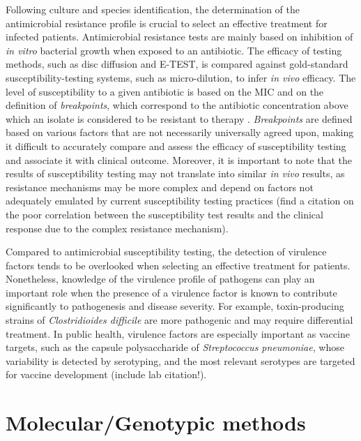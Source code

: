 Following culture and species identification, the determination of the antimicrobial resistance profile is crucial to select an effective treatment for infected patients. Antimicrobial resistance tests are mainly based on inhibition of \textit{in vitro} bacterial growth when exposed to an antibiotic. The efficacy of testing methods, such as disc diffusion and E-TEST, is compared against gold-standard susceptibility-testing systems, such as micro-dilution, to infer \textit{in vivo} efficacy.
The level of susceptibility to a given antibiotic is based on the \ac{MIC} and on the definition of \textit{breakpoints}, which correspond to the antibiotic concentration above which an isolate is considered to be resistant to therapy \cite{didelot_transforming_2012}. \textit{Breakpoints} are defined based on various factors that are not necessarily universally agreed upon, making it difficult to accurately compare and assess the efficacy of susceptibility testing and associate it with clinical outcome. Moreover, it is important to note that the results of susceptibility testing may not translate into similar \textit{in vivo} results, as resistance mechanisms may be more complex and depend on factors not adequately emulated by current susceptibility testing practices \cite{didelot_transforming_2012} (find a citation on the poor correlation between the susceptibility test results and the clinical response due to the complex resistance mechanism).

Compared to antimicrobial susceptibility testing, the detection of virulence factors tends to be overlooked when selecting an effective treatment for patients. Nonetheless, knowledge of the virulence profile of pathogens can play an important role when the presence of a virulence factor is known to contribute significantly to pathogenesis and disease severity. For example, toxin-producing strains of \textit{Clostridioides difficile} are more pathogenic and may require differential treatment. In public health, virulence factors are especially important as vaccine targets, such as the capsule polysaccharide of \textit{Streptococcus pneumoniae}, whose variability is detected by serotyping, and the most relevant serotypes are targeted for vaccine development (include lab citation!).

\section{Molecular/Genotypic methods}

